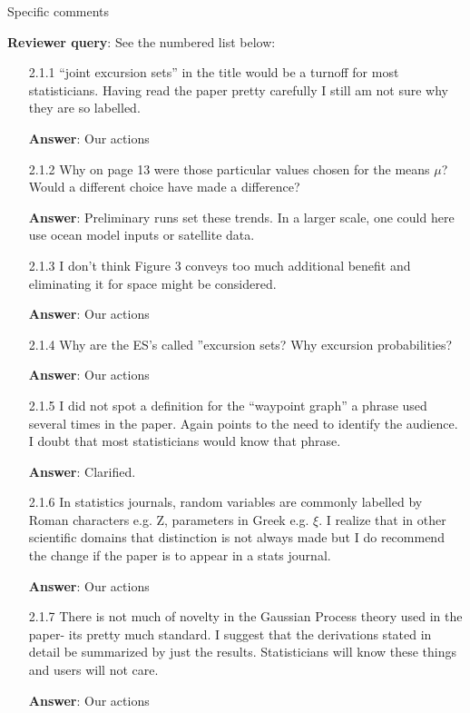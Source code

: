 \documentclass[a4paper]{article}
\def\reply{\textbf{Reviewer query}}
\def\action{\textbf{Answer}}
\begin{document}
\begin{answers}
\item{Specific comments}\label{q11}

\reply: See the numbered list below:
\begin{itemize}[noitemsep,topsep=0pt,parsep=0pt,partopsep=0pt]

\item[2.1.1] “joint excursion sets” in the title would be a turnoff for most statisticians. Having read the paper pretty carefully I still am not sure why they are so labelled.\par
\action: Our actions
\vspace{1em}

\item[2.1.2] Why on page 13 were those particular values chosen for the means $\mu$? Would a different choice have made a difference?\par
\action: Preliminary runs set these trends. In a larger scale, one could here use ocean model inputs or satellite data. 

\vspace{1em}

\item[2.1.3] I don’t think Figure 3 conveys too much additional benefit and eliminating it for space might be considered.\par
\action: Our actions
\vspace{1em}

\item[2.1.4] Why are the ES’s called ”excursion sets? Why excursion probabilities?\par
\action: Our actions
\vspace{1em}

\item[2.1.5] I did not spot a definition for the “waypoint graph” a phrase used several times in the paper. Again points to the need to identify the audience. I doubt that most statisticians would know that phrase.\par
\action: Clarified. 
\vspace{1em}

\item[2.1.6] In statistics journals, random variables are commonly labelled by Roman characters e.g. Z, parameters in Greek e.g. $\xi$. I realize that in other scientific domains that distinction is not always made but I do recommend the change if the paper is to appear in a stats journal.\par 
\action: Our actions
\vspace{1em}

\item[2.1.7] There is not much of novelty in the Gaussian Process theory used in the paper- its pretty much standard. I suggest that the derivations stated in detail be summarized by just the results. Statisticians will know these things and users will not care.\par
\action: Our actions
\vspace{1em}

\end{itemize}

\end{answers}
\end{document}
